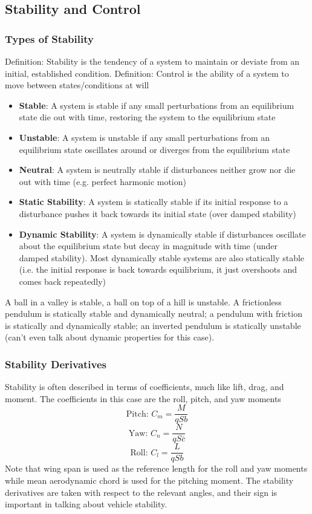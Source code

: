 \documentclass[11pt]{article}
\newcommand{\Item}[1]{\item \textbf{#1}:}
\begin{document}
\subsection{Stability and Control}
\subsubsection{Types of Stability}
Definition: Stability is the tendency of a system to maintain or deviate from an initial, established condition.
Definition: Control is the ability of a system to move between states/conditions at will
\begin{itemize}
\Item{Stable} A system is stable if any small perturbations from an equilibrium state die out with time, restoring the system to the equilibrium state
\Item{Unstable} A system is unstable if any small perturbations from an equilibrium state oscillates around or diverges from the equilibrium state
\Item{Neutral} A system is neutrally stable if disturbances neither grow nor die out with time (e.g. perfect harmonic motion)
\Item{Static Stability} A system is statically stable if its initial response to a disturbance pushes it back towards its initial state (over damped stability)
\Item{Dynamic Stability} A system is dynamically stable if disturbances oscillate about the equilibrium state but decay in magnitude with time (under damped stability). Most dynamically stable systems are also statically stable (i.e. the initial response is back towards equilibrium, it just overshoots and comes back repeatedly)
\end{itemize}

A ball in a valley is stable, a ball on top of a hill is unstable. A frictionless pendulum is statically stable and dynamically neutral; a pendulum with friction is statically and dynamically stable; an inverted pendulum is statically unstable (can't even talk about dynamic properties for this case).
\subsubsection{Stability Derivatives}
Stability is often described in terms of coefficients, much like lift, drag, and moment. The coefficients in this case are the roll, pitch, and yaw moments
$$\textrm{Pitch: }C_m = \frac{M}{qSb}$$
$$\textrm{Yaw: }C_n = \frac{N}{qS\bar{c}}$$
$$\textrm{Roll: }C_l = \frac{L}{qSb}$$
Note that wing span is used as the reference length for the roll and yaw moments while mean aerodynamic chord is used for the pitching moment. The stability derivatives are taken with respect to the relevant angles, and their sign is important in talking about vehicle stability.
\end{document}
